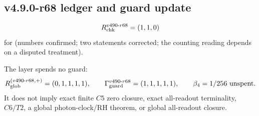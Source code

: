\subsection*{v4.9.0-r68 ledger and guard update}
\label{subsec:v490-r68-ledger-guard}

\[
R_{\rm chk}^{v490\text{-}r68}=(1,1,0)
\]
for (numbers confirmed; two statements corrected; the counting reading depends on a disputed treatment).

The layer spends no guard:
\[
R_{\rm glob}^{(v490\text{-}r68,+)}=(0,1,1,1,1),
\qquad
\Gamma_{\rm guard}^{v490\text{-}r68}=(1,1,1,1,1),
\qquad
\beta_4=1/256\ \text{unspent}.
\]
It does not imply exact finite \(C5\) zero closure, exact all-readout terminality,
\(C6/T2\), a global photon-clock/RH theorem, or global all-readout closure.
